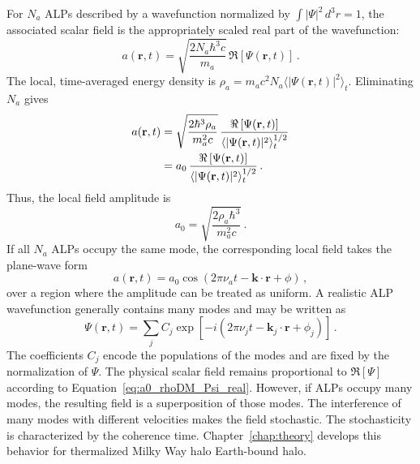 For $N_a$ ALPs described by a wavefunction normalized by $\int|\Psi|^2\,d^3r=1$, the associated scalar field is the appropriately scaled real part of the wavefunction:
\begin{equation}
    a(\mathbf{r},t)
    =\sqrt{\frac{2N_a\hbar^3c}{m_a}}\,
      \Re\left[\Psi(\mathbf{r},t)\right]
    \,.\label{eq:a0_Psi_real}
\end{equation}
The local, time-averaged energy density is $\rho_a=m_a c^2N_a\langle|\Psi(\mathbf{r},t)|^2\rangle_t$.
Eliminating $N_a$ gives
\begin{align}
    a(\mathbf{r},t)
    &=\sqrt{\frac{2\hbar^3\rho_a}{m_a^2c}}\,
      \frac{\Re\left[\Psi(\mathbf{r},t)\right]}
      {\langle|\Psi(\mathbf{r},t)|^2\rangle_t^{1/2}}
      \notag\\
    &=a_0\,
      \frac{\Re\left[\Psi(\mathbf{r},t)\right]}
      {\langle|\Psi(\mathbf{r},t)|^2\rangle_t^{1/2}}
    \,.\label{eq:a0_rhoDM_Psi_real}
\end{align}
Thus, the local field amplitude is
\begin{equation}
    a_0
    =\sqrt{\frac{2\rho_a\hbar^3}{m_a^2c}}
    \,.\label{eq:a0_rhoDM}
\end{equation}
If all $N_a$ ALPs occupy the same mode, the corresponding local field takes the plane-wave form
\begin{equation}
    a(\mathbf{r},t)
    =a_0\cos\left(2\pi\nu_a t-\mathbf{k}\cdot\mathbf{r}+\phi\right)
    \,,\label{eq:ALP_field}
\end{equation}
over a region where the amplitude can be treated as uniform. 
A realistic ALP wavefunction generally contains many modes and may be written as
\begin{equation}
    \Psi(\mathbf{r},t)
    =\sum_j C_j
    \exp\left[-i\left(2\pi\nu_jt-\mathbf{k}_j\cdot\mathbf{r}+\phi_j\right)\right]
    \,.\label{eq:ALP_sum}
\end{equation}
The coefficients $C_j$ encode the populations of the modes and are fixed by the normalization of $\Psi$.
The physical scalar field remains proportional to $\Re[\Psi]$ according to Equation~\eqref{eq:a0_rhoDM_Psi_real}.
However, if ALPs occupy many modes, the resulting field is a superposition of those modes. 
The interference of many modes with different velocities makes the field stochastic. 
The stochasticity is characterized by the coherence time. 
Chapter~\ref{chap:theory} develops this behavior for thermalized Milky Way halo Earth-bound halo.

